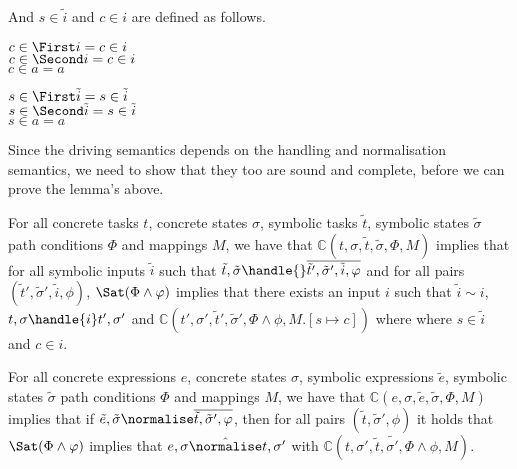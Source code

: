 And $s\in \tilde{i}$ and $c\in i$ are defined as follows.

\begin{definition}
  $c\in \First i = c\in i $\\
  $c\in \Second i = c\in i $\\
  $c\in a = a $
\end{definition}

\begin{definition}
  $s\in \First \tilde{i} = s\in \tilde{i} $\\
  $s\in \Second \tilde{i} = s\in \tilde{i} $\\
  $s\in a = a $
\end{definition}

Since the driving semantics depends on the handling and normalisation semantics, we need to show that they too are sound and complete, before we can prove the lemma's above.


\begin{lemma}
  \label{lem:soundhandle}

  For all concrete tasks $t$, concrete states $\sigma$, symbolic tasks $\tilde{t}$, symbolic states $\tilde{\sigma}$ path conditions $\Phi$ and mappings $M$,
  we have that $\mathds{C}(t,\sigma,\tilde{t},\tilde{\sigma},\Phi,M)$ implies
  that for all symbolic inputs $\tilde{i}$ such that $\tilde{t},\tilde{\sigma}\handle{}\overline{\tilde{t}',\tilde{\sigma}',\tilde{i},\phi}$ and
  for all pairs $(\tilde{t}',\tilde{\sigma}',\tilde{i},\phi)$,
  $\Sat(\Phi\land\phi)$ implies that there exists an input $i$ such that $\tilde{i}\sim i$,  $t,\sigma\handle{i}t',\sigma'$ and $\mathds{C}(t',\sigma',\tilde{t}',\tilde{\sigma}',\Phi\land\phi,M.[s\mapsto c])$ where where $s\in\tilde{i}$ and $c\in i$.

\end{lemma}



\begin{lemma}
  \label{lem:soundnorm}
  For all concrete expressions $e$, concrete states $\sigma$, symbolic expressions $\tilde{e}$, symbolic states $\tilde{\sigma}$ path conditions $\Phi$ and mappings $M$,
  we have that $\mathds{C}(e,\sigma,\tilde{e},\tilde{\sigma},\Phi,M)$ implies
  that if $\tilde{e},\tilde{\sigma}\normalise\overline{\tilde{t},\tilde{\sigma}',\phi}$,
  then for all pairs $(\tilde{t},\tilde{\sigma}',\phi)$ it holds that $\Sat(\Phi\land\phi)$ implies
  that $e,\sigma\hat{\normalise}t,\sigma'$ with $\mathds{C}(t,\sigma',\tilde{t},\tilde{\sigma'},\Phi\land\phi,M)$.
\end{lemma}


